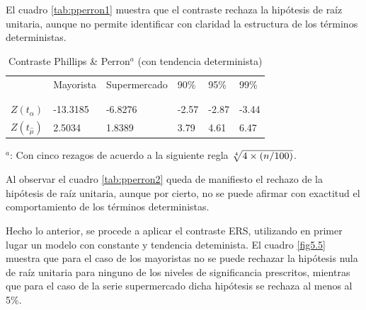 \documentclass[12pt, twoside]{book}\usepackage[]{graphicx}\usepackage[]{color}
\numberwithin{equation}{section}
\numberwithin{theorem}{section}
\numberwithin{teorema}{section}
\numberwithin{defi}{section}
\numberwithin{prop}{section}
\numberwithin{defi}{section}
\theoremstyle{plain}
\begin{document}
El cuadro \ref{tab:pperron1} muestra que el contraste rechaza la hipótesis de raíz unitaria, aunque no permite identificar con claridad la estructura de los términos deterministas. 





\begin{table}[!htpb]
\centering
\begin{threeparttable}
\caption{Contraste Phillips \& Perron$^{a}$ (con tendencia determinista) \label{tab:pperron2}}
\begin{tabular}{@{}llllll@{}}
\toprule
\multicolumn{1}{c}{} &
\multicolumn{1}{l}{Mayorista} & 
\multicolumn{1}{l}{Supermercado} & 
90\% & 95\% & 99\% \\ 
\\
\cmidrule(l){2-2} \cmidrule(l){3-3} \cmidrule(l){4-6} \\
$Z(t_{\hat{\alpha}})$ & -13.3185 & -6.8276 &  -2.57 & -2.87 & -3.44 \\
$Z(t_{\hat{\mu}})$ & 2.5034 & 1.8389 & 3.79 & 4.61 & 6.47 \\
\bottomrule
\end{tabular}
\label{tab-5}
\begin{tablenotes}
\small 
\item $^{a}$: Con cinco rezagos de acuerdo a la siguiente regla $\root 4 \of {4 \times (n/100)}$. 
\end{tablenotes}
\end{threeparttable}
\end{table}

Al observar el cuadro \ref{tab:pperron2} queda de manifiesto el rechazo de la hipótesis de raíz unitaria, aunque por cierto, no se puede afirmar con exactitud el comportamiento de los términos deterministas. 



Hecho lo anterior, se procede a aplicar el contraste ERS, utilizando en primer lugar un modelo con constante y tendencia deteminista. El cuadro \ref{fig5.5} muestra que para el caso de los mayoristas no se puede rechazar la hipótesis nula de raíz unitaria para ninguno de los niveles de significancia prescritos, mientras que para el caso de la serie supermercado dicha hipótesis se rechaza al menos al 5\%.  
\end{document}
